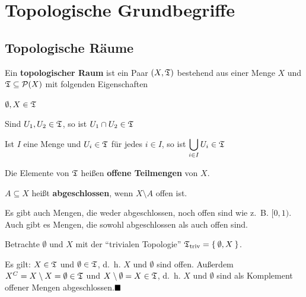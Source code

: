 \chapter{Topologische Grundbegriffe}
\section{Topologische Räume}
\begin{definition}%
    Ein \textbf{topologischer Raum} ist ein Paar $(X, \mathfrak{T})$ bestehend
    aus einer Menge $X$ und $\mathfrak{T} \subseteq \mathcal{P}(X)$ mit
    folgenden Eigenschaften
    \begin{defenumprops}
        \item $\emptyset, X \in \mathfrak{T}$
        \item \label{def:topologie.ii} Sind $U_1, U_2 \in \mathfrak{T}$, so ist $U_1 \cap U_2 \in \mathfrak{T}$
        \item Ist $I$ eine Menge und $U_i \in \mathfrak{T}$ für jedes $i \in I$,
              so ist $\displaystyle \bigcup_{i \in I} U_i \in \mathfrak{T}$
    \end{defenumprops}
    Die Elemente von $\mathfrak{T}$ heißen \textbf{offene Teilmengen} von $X$. 

    $A \subseteq X$ heißt \textbf{abgeschlossen}, wenn $X \setminus A$ offen ist.
\end{definition}

Es gibt auch Mengen, die weder abgeschlossen, noch offen sind wie z.~B. $[0,1)$.
Auch gibt es Mengen, die sowohl abgeschlossen als auch offen sind.

\begin{bemerkung}%
    Betrachte $\emptyset$ und $X$ mit der \enquote{trivialen Topologie}
     $\mathfrak{T}_{\textnormal{triv}} = \Set{\emptyset, X}$.

    Es gilt: $X \in \mathfrak{T}$ und $\emptyset \in \mathfrak{T}$, d.~h. $X$ und $\emptyset$
    sind offen. Außerdem $X^C = X \setminus X = \emptyset \in \mathfrak{T}$
    und $X \setminus \emptyset = X \in \mathfrak{T}$, d.~h. $X$ und $\emptyset$
    sind als Komplement offener Mengen abgeschlossen.$\qed$
\end{bemerkung}

